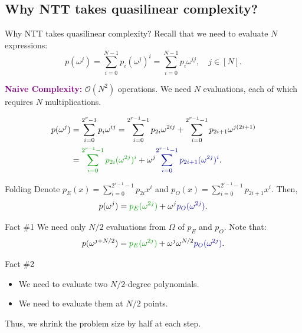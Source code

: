\documentclass{zkdl-presentation-template}
\begin{document}
    \subsection{Why NTT takes quasilinear complexity?}

    \begin{frame}{Why NTT takes quasilinear complexity?}
        Recall that we need to evaluate $N$ expressions:
        \begin{equation*}
            p(\omega^j) = \sum_{i=0}^{N-1}p_i(\omega^j)^i = \sum_{i=0}^{N-1}p_i\omega^{ij}, \quad j \in [N].
        \end{equation*}

        \pause\textcolor{purple}{\textbf{Naive Complexity:}} $\mathcal{O}(N^2)$ operations. We need $N$ evaluations, 
        each of which requires $N$ multiplications.\pause

        \begin{align*}
            p(\omega^j) &= \sum_{i=0}^{2^r-1}p_i\omega^{ij} = \sum_{i=0}^{2^{r-1}-1}p_{2i}\omega^{2ij} + \sum_{i=0}^{2^{r-1}-1}p_{2i+1}\omega^{j(2i+1)}\\
            &= \textcolor{green!60!black}{\sum_{i=0}^{2^{r-1}-1}p_{2i}(\omega^{2j})^i} + \omega^j\textcolor{blue!60!black}{\sum_{i=0}^{2^{r-1}-1}p_{2i+1}(\omega^{2j})^i}.
        \end{align*}
    \end{frame}

    \begin{frame}{Folding}
        Denote $p_E(x) = \sum_{i=0}^{2^{r-1}-1}p_{2i}x^i$ and $p_O(x) = \sum_{i=0}^{2^{r-1}-1}p_{2i+1}x^i$. Then,
        \begin{equation*}
            p(\omega^j) = \textcolor{green!60!black}{p_E(\omega^{2j})} + \omega^j \textcolor{blue!60!black}{p_O(\omega^{2j})}.
        \end{equation*}

        \pause\begin{block}{Fact \#1}
            We need only $N/2$ evaluations from $\Omega$ of $p_E$ and $p_O$. Note that:
            \begin{equation*}
                p(\omega^{j+N/2}) = \textcolor{green!60!black}{p_E(\omega^{2j})} + \omega^j\omega^{N/2} \textcolor{blue!60!black}{p_O(\omega^{2j})}.
            \end{equation*}
        \end{block}

        \pause\begin{block}{Fact \#2}
            \begin{itemize}
                \item We need to evaluate two $N/2$-degree polynomials.\pause
                \item We need to evaluate them at $N/2$ points.\pause
            \end{itemize}

            Thus, we shrink the problem size by half at each step.
        \end{block}
    \end{frame}
\end{document}
